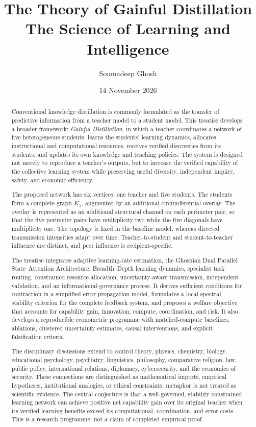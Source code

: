 \documentclass[11pt,a4paper]{article}
\title{\textbf{The Theory of Gainful Distillation}\\
\large The Science of Learning and Intelligence}
\author{Soumadeep Ghosh}
\date{14 November 2026}
\begin{document}
\maketitle

\begin{abstract}
Conventional knowledge distillation is commonly formulated as the transfer of predictive information from a teacher model to a student model. This treatise develops a broader framework: \emph{Gainful Distillation}, in which a teacher coordinates a network of five heterogeneous students, learns the students' learning dynamics, allocates instructional and computational resources, receives verified discoveries from its students, and updates its own knowledge and teaching policies. The system is designed not merely to reproduce a teacher's outputs, but to increase the verified capability of the collective learning system while preserving useful diversity, independent inquiry, safety, and economic efficiency.

The proposed network has six vertices: one teacher and five students. The students form a complete graph \(K_5\), augmented by an additional circumferential overlay. The overlay is represented as an additional structural channel on each perimeter pair, so that the five perimeter pairs have multiplicity two while the five diagonals have multiplicity one. The topology is fixed in the baseline model, whereas directed transmission intensities adapt over time. Teacher-to-student and student-to-teacher influence are distinct, and peer influence is recipient-specific.

The treatise integrates adaptive learning-rate estimation, the Ghoshian Dual Parallel State--Attention Architecture, Breadth--Depth learning dynamics, specialist task routing, constrained resource allocation, uncertainty-aware transmission, independent validation, and an informational-governance process. It derives sufficient conditions for contraction in a simplified error-propagation model, formulates a local spectral stability criterion for the complete feedback system, and proposes a welfare objective that accounts for capability gain, innovation, compute, coordination, and risk. It also develops a reproducible econometric programme with matched-compute baselines, ablations, clustered uncertainty estimates, causal interventions, and explicit falsification criteria.

The disciplinary discussions extend to control theory, physics, chemistry, biology, educational psychology, psychiatry, linguistics, philosophy, comparative religion, law, public policy, international relations, diplomacy, cybersecurity, and the economics of security. These connections are distinguished as mathematical imports, empirical hypotheses, institutional analogies, or ethical constraints; metaphor is not treated as scientific evidence. The central conjecture is that a well-governed, stability-constrained learning network can achieve positive net capability gain over its original teacher when its verified learning benefits exceed its computational, coordination, and error costs. This is a research programme, not a claim of completed empirical proof.
\end{abstract}
\end{document}
